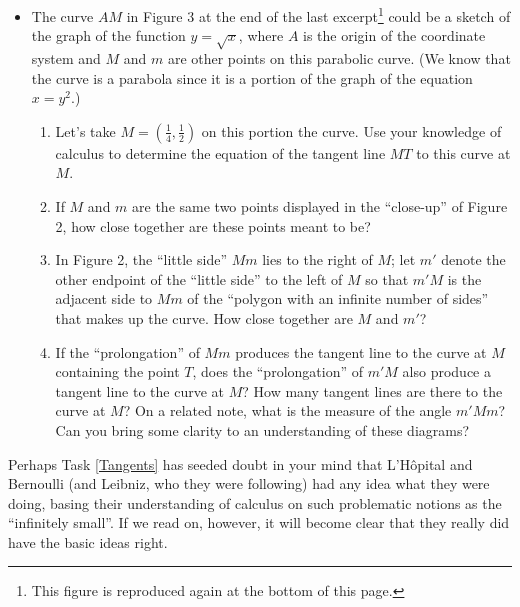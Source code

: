 \documentclass[11pt]{article}
\newcounter{tasknumb}
\newcommand{\tasknumb}[1]{\refstepcounter{tasknumb}\textmd{\textbf{$\fbox{$\fbox{Task \thetasknumb}$}$}}#1}
\newenvironment{task}[1][]%
 {\begin{itemize}
 \item[\tasknumb{#1}] }
{
    \end{itemize}    }%
\begin{document}
\newpage
\begin{task}[\label{Tangents}]
The curve $AM$ in Figure 3 at the end of the last excerpt\footnote{This figure is reproduced again at the bottom of this page.} could be a sketch of the graph of the function $y=\sqrt{x}$, where $A$ is the origin of the coordinate system and $M$ and $m$ are other points on this parabolic curve. (We know that the curve is a parabola since it is a portion of the graph of the equation $x=y^2$.)
\begin{enumerate}
\item[(a)] Let's take $M=(\frac14, \frac12)$ on this portion the curve. Use your knowledge of calculus to determine the equation of the tangent line $MT$ to this curve at $M$. \\
\item[(b)] If $M$ and $m$ are the same two points displayed in the ``close-up'' of Figure 2, how close together are these points meant to be? \\
\item[(c)] In Figure 2, the ``little side'' $Mm$ lies to the right of $M$; let $m'$ denote the other endpoint of the ``little side'' to the left of $M$ so that $m'M$ is the adjacent side to $Mm$ of the ``polygon with an infinite number of sides'' that makes up the curve. How close together are $M$ and $m'$? \\
\item[(d)] If the ``prolongation'' of $Mm$ produces the tangent line to the curve at $M$ containing the point $T$, does the ``prolongation'' of $m'M$ also produce a tangent line to the curve at $M$? How many tangent lines are there to the curve at $M$? On a related note, what is the measure of the angle $m'Mm$? Can you bring some clarity to an understanding of these diagrams?
\end{enumerate}
\end{task}


Perhaps Task \ref{Tangents} %
has seeded doubt in your mind that L'H\^opital and Bernoulli (and Leibniz, who they were following) had any idea what they were doing, basing their understanding of calculus on such problematic notions as the ``infinitely small''. If we read on, however, it will become clear that they really did have the basic ideas right.

\bigskip
\end{document}
